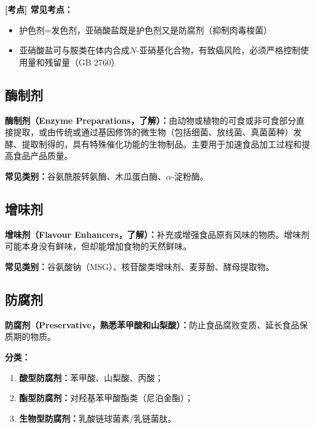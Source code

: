 \begin{exambox}
\textbf{[考点] 常见考点：}
\begin{itemize}[leftmargin=*]
    \item 护色剂=发色剂，亚硝酸盐既是护色剂又是防腐剂（抑制肉毒梭菌）
    \item 亚硝酸盐可与胺类在体内合成$N$-亚硝基化合物，有致癌风险，必须严格控制使用量和残留量（GB 2760）
\end{itemize}
\end{exambox}

\subsection{酶制剂}

\begin{tipbox}
\textbf{酶制剂（Enzyme Preparations，了解）：}由动物或植物的可食或非可食部分直接提取，或由传统或通过基因修饰的微生物（包括细菌、放线菌、真菌菌种）发酵、提取制得的，具有特殊催化功能的生物制品。主要用于加速食品加工过程和提高食品产品质量。

\textbf{常见类别：}谷氨酰胺转氨酶、木瓜蛋白酶、$\alpha$-淀粉酶。
\end{tipbox}

\subsection{增味剂}

\begin{tipbox}
\textbf{增味剂（Flavour Enhancers，了解）：}补充或增强食品原有风味的物质。增味剂可能本身没有鲜味，但却能增加食物的天然鲜味。

\textbf{常见类别：}谷氨酸钠（MSG）、核苷酸类增味剂、麦芽酚、酵母提取物。
\end{tipbox}

\subsection{防腐剂}

\begin{tipbox}
\textbf{防腐剂（Preservative，熟悉苯甲酸和山梨酸）：}防止食品腐败变质、延长食品保质期的物质。

\textbf{分类：}
\begin{enumerate}[leftmargin=*]
    \item \textbf{酸型防腐剂：}苯甲酸、山梨酸、丙酸；
    \item \textbf{酯型防腐剂：}对羟基苯甲酸酯类（尼泊金酯）；
    \item \textbf{生物型防腐剂：}乳酸链球菌素/乳链菌肽。
\end{enumerate}
\end{tipbox}

